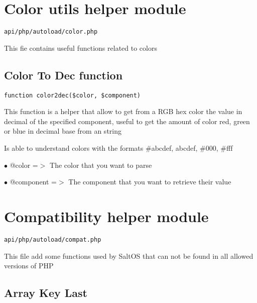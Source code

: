 \documentclass[a4paper]{book}
\begin{document}
\hypertarget{toc49}{}
\section{Color utils helper module}

\begin{lstlisting}
api/php/autoload/color.php
\end{lstlisting}

This fie contains useful functions related to colors

\hypertarget{toc50}{}
\subsection{Color To Dec function}

\begin{lstlisting}
function color2dec($color, $component)
\end{lstlisting}

This function is a helper that allow to get from a RGB hex color the value
in decimal of the specified component, useful to get the amount of color
red, green or blue in decimal base from an string

Is able to understand colors with the formats \#abcdef, abcdef, \#000, \#fff

\begin{compactitem}
\item[\color{myblue}$\bullet$] @color     =$>$ The color that you want to parse
\item[\color{myblue}$\bullet$] @component =$>$ The component that you want to retrieve their value
\end{compactitem}

\hypertarget{toc51}{}
\section{Compatibility helper module}

\begin{lstlisting}
api/php/autoload/compat.php
\end{lstlisting}

This file add some functions used by SaltOS that can not be found in all allowed versions of PHP

\hypertarget{toc52}{}
\subsection{Array Key Last}
\end{document}
